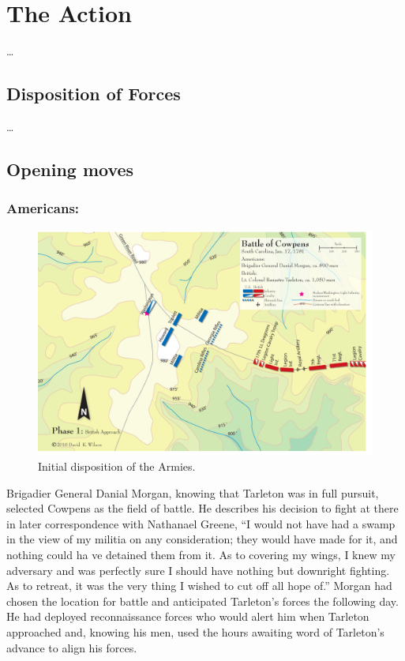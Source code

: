 \section{The Action}

\ldots

\subsection{Disposition of Forces}

\ldots

\subsection{Opening moves}

\subsubsection{Americans:}

\begin{figure}[h]
    \begin{center}
    \includegraphics[width=6in]{gfx/beiber01}
    \end{center}
    \caption{Initial disposition of the Armies.\cite{wilson_blogmap}}
    \label{terrain1}
\end{figure}

Brigadier General Danial Morgan, knowing that Tarleton was in full pursuit,
selected Cowpens as the field of battle. He describes his decision to fight at
there in later correspondence with Nathanael Greene, ``I would not have had a
swamp in the view of my militia on any consideration; they would have made for
it, and nothing could ha ve detained them from it. As to covering my wings, I
knew my adversary and was perfectly sure I should have nothing but downright
fighting. As to retreat, it was the very thing I wished to cut off all hope of.''
\cite[46]{moncure_cowpens_1996} Morgan had chosen the location for battle and anticipated
Tarleton's forces the following day. He had deployed reconnaissance forces who
would alert him when Tarleton approached and, knowing his men, used the hours
awaiting word of Tarleton's advance to align his forces.

